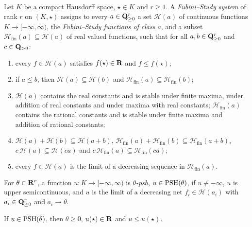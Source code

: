 \begin{definition}\label{def:pg-fs-system}
\leanok
{}
Let $K$ be a compact Hausdorff space, $\star\in K$ and $r\ge1$. A \emph{Fubini--Study system} of rank $r$ on $(K,\star)$
assigns to every $a\in\mathbf{Q}^r_{\ge0}$ a set $\mathcal H(a)$ of continuous functions $K\to[-\infty,\infty)$, the
\emph{Fubini--Study functions of class $a$}, and a subset $\mathcal H_{\mathrm{fin}}(a)\subseteq\mathcal H(a)$ of real
valued functions, such that for all $a,b\in\mathbf{Q}^r_{\ge0}$ and $c\in\mathbf{Q}_{>0}$:
\begin{enumerate}
\item[(FS1)] every $f\in\mathcal H(a)$ satisfies $f(\star)\in\mathbf{R}$ and $f\le f(\star)$;
\item[(FS2)] if $a\le b$, then $\mathcal H(a)\subseteq\mathcal H(b)$ and $\mathcal H_{\mathrm{fin}}(a)\subseteq\mathcal H_{\mathrm{fin}}(b)$;
\item[(FS3)] $\mathcal H(a)$ contains the real constants and is stable under finite maxima, under addition of real
constants and under maxima with real constants; $\mathcal H_{\mathrm{fin}}(a)$ contains the rational constants and is
stable under finite maxima and addition of rational constants;
\item[(FS4)] $\mathcal H(a)+\mathcal H(b)\subseteq\mathcal H(a+b)$,
$\mathcal H_{\mathrm{fin}}(a)+\mathcal H_{\mathrm{fin}}(b)\subseteq\mathcal H_{\mathrm{fin}}(a+b)$, $c\,\mathcal H(a)\subseteq\mathcal H(ca)$ and
$c\,\mathcal H_{\mathrm{fin}}(a)\subseteq\mathcal H_{\mathrm{fin}}(ca)$;
\item[(FS5)] every $f\in\mathcal H(a)$ is the limit of a decreasing sequence in $\mathcal H_{\mathrm{fin}}(a)$.
\end{enumerate}
\end{definition}

\begin{definition}\label{def:pg-psh}
\leanok
{}
For $\theta\in\mathbf{R}^r$, a function $u\colon K\to[-\infty,\infty)$ is \emph{$\theta$-psh}, $u\in\operatorname{PSH}(\theta)$, if
$u\not\equiv-\infty$, $u$ is upper semicontinuous, and $u$ is the limit of a decreasing net $f_i\in\mathcal H(a_i)$ with
$a_i\in\mathbf{Q}^r_{\ge0}$ and $a_i\to\theta$.
\end{definition}

\begin{proposition}\label{prop:pg-maxprin}
\leanok
{}
If $u\in\operatorname{PSH}(\theta)$, then $\theta\ge0$, $u(\star)\in\mathbf{R}$ and $u\le u(\star)$.
\end{proposition}

